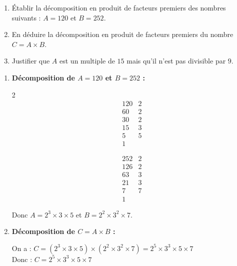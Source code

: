 \documentclass[10pt, a4paper]{article}
\begin{document}
\begin{Application}[][20 min]
\begin{enumerate}[leftmargin=*,itemsep=0.5pt]
    \item Établir la décomposition en produit de facteurs premiers des nombres suivants : $A = 120$ et $B = 252$.
    
    \item En déduire la décomposition en produit de facteurs premiers du nombre $C = A \times B$.
    
    \item Justifier que $A$ est un multiple de $15$ mais qu'il n'est pas divisible par $9$.
\end{enumerate}
\end{Application}

\begin{Solution}[APPLICATION][9]
\begin{enumerate}[leftmargin=*,itemsep=0.5pt]
    \item \textbf{Décomposition de $A = 120$ et $B = 252$ :}

    \begin{multicols}{2}
    \[
    \begin{array}{r|l}
    120 & 2 \\
    60  & 2 \\
    30  & 2 \\
    15  & 3 \\
    5   & 5 \\
    1   &
    \end{array}
    \]

    \columnbreak

    \[
    \begin{array}{r|l}
    252 & 2 \\
    126 & 2 \\
    63  & 3 \\
    21  & 3 \\
    7   & 7 \\
    1   &
    \end{array}
    \]
    \end{multicols}
    Donc $A = 2^3 \times 3 \times 5$ et $B = 2^2 \times 3^2 \times 7$.

    \item \textbf{Décomposition de $C = A \times B$ :}

    On a :
        $C = (2^3 \times 3 \times 5) \times (2^2 \times 3^2 \times 7) 
          = 2^5 \times 3^3 \times 5 \times 7$ \\
    Donc : \quad $C = 2^5 \times 3^3 \times 5 \times 7$


\end{enumerate}
\end{Solution}
\end{document}

